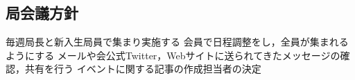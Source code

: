 \subsection*{局会議方針}


毎週局長と新入生局員で集まり実施する
会員で日程調整をし，全員が集まれるようにする
メールや会公式Twitter，Webサイトに送られてきたメッセージの確認，共有を行う
イベントに関する記事の作成担当者の決定
